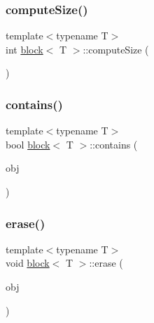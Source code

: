 \mbox{\label{classblock_ab15ffcbd3f70d06e95242afcfa801038}} 
\subsubsection{\texorpdfstring{compute\+Size()}{computeSize()}}
{\footnotesize\ttfamily template$<$typename T$>$ \\
int \hyperlink{classblock}{block}$<$ T $>$\+::compute\+Size (\begin{DoxyParamCaption}{ }\end{DoxyParamCaption})\hspace{0.3cm}{\ttfamily [inline]}}

\mbox{\label{classblock_a5577a11404c029904366f2ca986af19d}} 
\subsubsection{\texorpdfstring{contains()}{contains()}}
{\footnotesize\ttfamily template$<$typename T$>$ \\
bool \hyperlink{classblock}{block}$<$ T $>$\+::contains (\begin{DoxyParamCaption}\item[{T $\ast$const}]{obj }\end{DoxyParamCaption})\hspace{0.3cm}{\ttfamily [inline]}}

\mbox{\label{classblock_aacb3664270c63f99c066035e7ca2fcc9}} 
\subsubsection{\texorpdfstring{erase()}{erase()}\hspace{0.1cm}{\footnotesize\ttfamily [1/2]}}
{\footnotesize\ttfamily template$<$typename T$>$ \\
void \hyperlink{classblock}{block}$<$ T $>$\+::erase (\begin{DoxyParamCaption}\item[{T $\ast$const}]{obj }\end{DoxyParamCaption})\hspace{0.3cm}{\ttfamily [inline]}}

